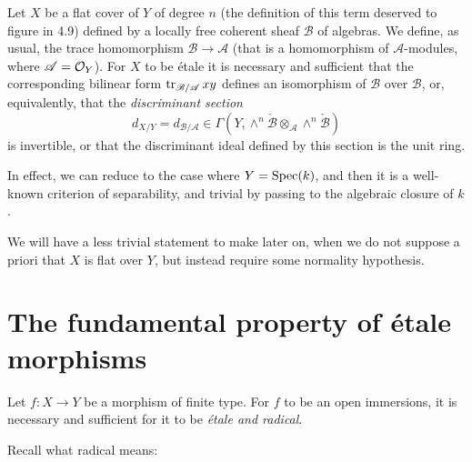 \begin{prop}
    Let $X$ be a flat cover of $Y$ of degree $n$ (the definition of this term deserved to figure in 4.9) defined by a locally free coherent sheaf $\mathscr{B}$ of algebras.
    We define, as usual, the trace homomorphism $\mathscr{B}\to\mathscr{A}$ (that is a homomorphism of $\mathscr{A}$-modules, where $\mathscr{A}=\mathcal{O}_Y$).
    For $X$ to be étale it is necessary and sufficient that the corresponding bilinear form $\operatorname{tr}_{\mathscr{B}/\mathscr{A}}xy$ defines an isomorphism of $\mathscr{B}$ over $\mathscr{B}$, or, equivalently, that the \emph{discriminant section}
    \begin{equation*}
        d_{X/Y}=d_{\mathscr{B}/\mathscr{A}}\in\Gamma(Y,\wedge^n\check{\mathscr{B}}\otimes_\mathscr{A}\wedge^n\check{\mathscr{B}})
    \end{equation*}
    is invertible, or that the discriminant ideal defined by this section is the unit ring.
\end{prop}

In effect, we can reduce to the case where $Y=\operatorname{Spec}(k)$, and then it is a well-known criterion of separability, and trivial by passing to the algebraic closure of $k$.

\begin{rem}
    We will have a less trivial statement to make later on, when we do not suppose a priori that $X$ is flat over $Y$, but instead require some normality hypothesis.
\end{rem}


\section{The fundamental property of étale morphisms}

\begin{thm}
    Let $f\colon X\to Y$ be a morphism of finite type.
    For $f$ to be an open immersions, it is necessary and sufficient for it to be \emph{étale and radical}.
\end{thm}

Recall what radical means:

